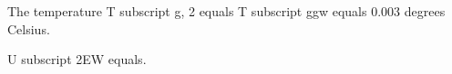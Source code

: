 The temperature T subscript g, 2 equals T subscript ggw equals 0.003 degrees Celsius.

U subscript 2EW equals.
